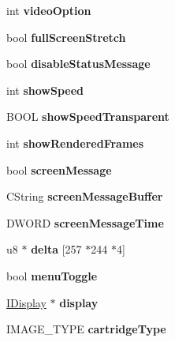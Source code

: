 \begin{DoxyCompactItemize}
int {\bfseries video\+Option}
\item 
\mbox{\label{class_v_b_a_a00bd5b85110bd763ad39eb4a9fb403a1}} 
bool {\bfseries full\+Screen\+Stretch}
\item 
\mbox{\label{class_v_b_a_a7bfea5ab60b19d26053b22ce070e2248}} 
bool {\bfseries disable\+Status\+Message}
\item 
\mbox{\label{class_v_b_a_ad86589d0d03fceef36d35c0b2e928e9e}} 
int {\bfseries show\+Speed}
\item 
\mbox{\label{class_v_b_a_a0a2ca5a7091f9c79b39ea0916dd88a05}} 
B\+O\+OL {\bfseries show\+Speed\+Transparent}
\item 
\mbox{\label{class_v_b_a_a2d041dae40bdb47cd6bd28463cc484d9}} 
int {\bfseries show\+Rendered\+Frames}
\item 
\mbox{\label{class_v_b_a_a204d14d33aebd442db9affee1cc4f3a8}} 
bool {\bfseries screen\+Message}
\item 
\mbox{\label{class_v_b_a_ab9551bfe042a30531aeb47a7b2ac2038}} 
C\+String {\bfseries screen\+Message\+Buffer}
\item 
\mbox{\label{class_v_b_a_a27f8c0f4add5a8242470289874dd601c}} 
D\+W\+O\+RD {\bfseries screen\+Message\+Time}
\item 
\mbox{\label{class_v_b_a_ae53d4a6574bd47657fa6bd76eabd8543}} 
u8 $\ast$ {\bfseries delta} \mbox{[}257 $\ast$244 $\ast$4\mbox{]}
\item 
\mbox{\label{class_v_b_a_a0bacc38e144832326c5d4d6df6ababa3}} 
bool {\bfseries menu\+Toggle}
\item 
\mbox{\label{class_v_b_a_a940e5bad8b3ed2436888dbcd03bfd563}} 
\mbox{\hyperlink{class_i_display}{I\+Display}} $\ast$ {\bfseries display}
\item 
\mbox{\label{class_v_b_a_af300759fcbc7eeb00ce73f956fc5ddb7}} 
I\+M\+A\+G\+E\+\_\+\+T\+Y\+PE {\bfseries cartridge\+Type}
\item 

\end{DoxyCompactItemize}
